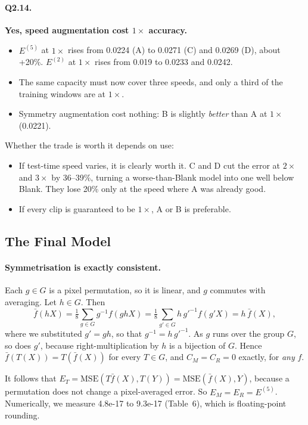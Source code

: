 \documentclass[11pt,a4paper]{article}
\begin{document}
\paragraph{Q2.14.} \textbf{Yes, speed augmentation cost $1\times$ accuracy.}
\begin{itemize}
  \item $E^{(5)}$ at $1\times$ rises from 0.0224 (A) to 0.0271 (C) and 0.0269
        (D), about +20\%. $E^{(2)}$ at $1\times$ rises from 0.019 to 0.0233 and
        0.0242.
  \item The same capacity must now cover three speeds, and only a third of the
        training windows are at $1\times$.
  \item Symmetry augmentation cost nothing: B is slightly \emph{better} than A
        at $1\times$ (0.0221).
\end{itemize}
Whether the trade is worth it depends on use:
\begin{itemize}
  \item If test-time speed varies, it is clearly worth it. C and D cut the error
        at $2\times$ and $3\times$ by 36--39\%, turning a worse-than-Blank
        model into one well below Blank. They lose 20\% only at the speed where
        A was already good.
  \item If every clip is guaranteed to be $1\times$, A or B is preferable.
\end{itemize}

\subsection{The Final Model}

\paragraph{Symmetrisation is exactly consistent.} Each $g\in G$ is a pixel
permutation, so it is linear, and $g$ commutes with averaging. Let
$h\in G$. Then
\[
  \bar f(hX)=\tfrac18\sum_{g\in G} g^{-1} f(ghX)
  =\tfrac18\sum_{g'\in G} h\,g'^{-1} f(g'X)
  =h\,\bar f(X),
\]
where we substituted $g'=gh$, so that $g^{-1}=h\,g'^{-1}$. As $g$ runs over the
group $G$, so does $g'$, because right-multiplication by $h$ is a bijection of
$G$. Hence $\bar f(T(X))=T(\bar f(X))$ for every $T\in G$, and
$C_M=C_R=0$ exactly, for \emph{any} $f$.

It follows that $E_T=\mathrm{MSE}(T\bar f(X),T(Y))=\mathrm{MSE}(\bar f(X),Y)$,
because a permutation does not change a pixel-averaged error. So $E_M=E_R=E^{(5)}$.
Numerically, we measure 4.8e-17 to 9.3e-17 (Table~6), which is floating-point
rounding.
\end{document}
